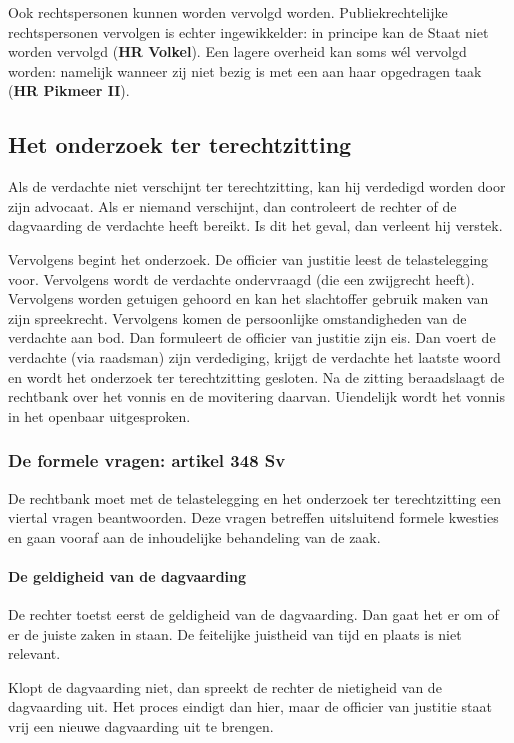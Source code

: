 \documentclass{article}
\begin{document}
Ook rechtspersonen kunnen worden vervolgd worden. Publiekrechtelijke
rechtspersonen vervolgen is echter ingewikkelder: in principe kan de Staat niet
worden vervolgd (\textbf{HR Volkel}). Een lagere overheid kan soms w\'el
vervolgd worden: namelijk wanneer zij niet bezig is met een aan haar opgedragen
taak (\textbf{HR Pikmeer II}).

\subsection{Het onderzoek ter terechtzitting}

Als de verdachte niet verschijnt ter terechtzitting, kan hij verdedigd worden
door zijn advocaat. Als er niemand verschijnt, dan controleert de rechter of de
dagvaarding de verdachte heeft bereikt. Is dit het geval, dan verleent hij
verstek.

Vervolgens begint het onderzoek. De officier van justitie leest de
telastelegging voor. Vervolgens wordt de verdachte ondervraagd (die een
zwijgrecht heeft). Vervolgens worden getuigen gehoord en kan het slachtoffer
gebruik maken van zijn spreekrecht. Vervolgens komen de persoonlijke
omstandigheden van de verdachte aan bod. Dan formuleert de officier van
justitie zijn eis. Dan voert de verdachte (via raadsman) zijn verdediging,
krijgt de verdachte het laatste woord en wordt het onderzoek ter terechtzitting
gesloten. Na de zitting beraadslaagt de rechtbank over het vonnis en de
movitering daarvan. Uiendelijk wordt het vonnis in het openbaar uitgesproken.

\subsubsection{De formele vragen: artikel 348 Sv}

De rechtbank moet met de telastelegging en het onderzoek ter terechtzitting
een viertal vragen beantwoorden. Deze vragen betreffen uitsluitend formele
kwesties en gaan vooraf aan de inhoudelijke behandeling van de zaak.

\paragraph{De geldigheid van de dagvaarding}

De rechter toetst eerst de geldigheid van de dagvaarding. Dan gaat het er
om of er de juiste zaken in staan. De feitelijke juistheid van tijd en plaats
is niet relevant.

Klopt de dagvaarding niet, dan spreekt de rechter de nietigheid van de
dagvaarding uit. Het proces eindigt dan hier, maar de officier van justitie
staat vrij een nieuwe dagvaarding uit te brengen.
\end{document}
